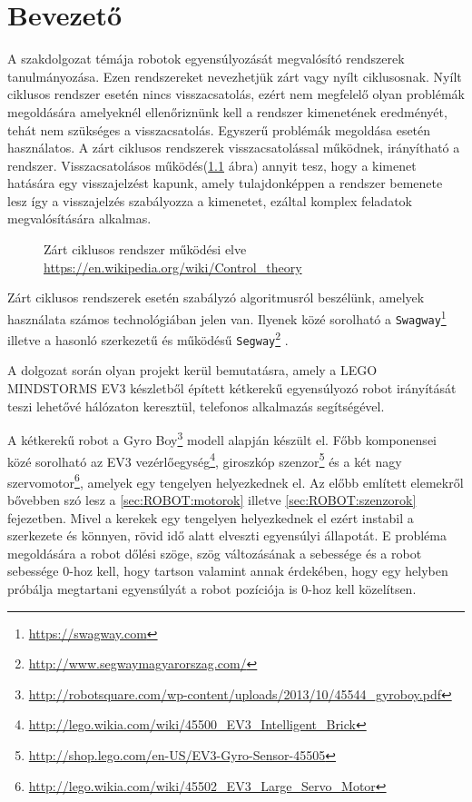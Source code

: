 \chapter{Bevezető}
A szakdolgozat témája robotok egyensúlyozását megvalósító rendszerek tanulmányozása. Ezen rendszereket nevezhetjük zárt vagy nyílt ciklusosnak. Nyílt ciklusos rendszer esetén nincs visszacsatolás, ezért nem megfelelő olyan problémák megoldására amelyeknél ellenőriznünk kell a rendszer kimenetének eredményét, tehát nem szükséges a visszacsatolás. Egyszerű problémák megoldása esetén használatos. A zárt ciklusos rendszerek visszacsatolással működnek, irányítható a rendszer. Visszacsatolásos működés(\ref{fig:closeLoop} ábra) annyit tesz, hogy a kimenet hatására egy visszajelzést kapunk, amely tulajdonképpen a rendszer bemenete lesz így a visszajelzés szabályozza a kimenetet, ezáltal komplex feladatok megvalósítására alkalmas.

\begin{figure}[!htb]
	\centering
	\caption[Zárt ciklusos rendszer működési elve.]
	{Zárt ciklusos rendszer működési elve \href{https://en.wikipedia.org/wiki/Control\_theory}{https://en.wikipedia.org/wiki/Control\_theory}}
	\label{fig:closeLoop}
\end{figure}

Zárt ciklusos rendszerek esetén szabályzó algoritmusról beszélünk, amelyek használata számos technológiában jelen van. Ilyenek közé sorolható a \texttt{Swagway}\footnote{\href{https://swagway.com}{https://swagway.com}} illetve a hasonló szerkezetű és működésű \texttt{Segway}\footnote{\href{http://www.segwaymagyarorszag.com/}{http://www.segwaymagyarorszag.com/}} .

A dolgozat során olyan projekt kerül bemutatásra, amely a LEGO MINDSTORMS EV3\cite{mindstormsEv3} készletből épített kétkerekű egyensúlyozó robot irányítását teszi lehetővé hálózaton keresztül, telefonos alkalmazás segítségével. 

A kétkerekű robot a Gyro Boy\footnote{\href{http://robotsquare.com/wp-content/uploads/2013/10/45544\_gyroboy.pdf}{http://robotsquare.com/wp-content/uploads/2013/10/45544\_gyroboy.pdf}} modell alapján készült el. Főbb komponensei közé sorolható az EV3 vezérlőegység\footnote{\href{http://lego.wikia.com/wiki/45500\_EV3\_Intelligent\_Brick}{http://lego.wikia.com/wiki/45500\_EV3\_Intelligent\_Brick}}, giroszkóp szenzor\footnote{\href{http://shop.lego.com/en-US/EV3-Gyro-Sensor-45505}{http://shop.lego.com/en-US/EV3-Gyro-Sensor-45505}} és a két nagy szervomotor\footnote{\href{http://lego.wikia.com/wiki/45502\_EV3\_Large\_Servo\_Motor}{http://lego.wikia.com/wiki/45502\_EV3\_Large\_Servo\_Motor}}, amelyek egy tengelyen helyezkednek el. Az előbb említett elemekről bővebben szó lesz a \ref{sec:ROBOT:motorok} illetve \ref{sec:ROBOT:szenzorok} fejezetben. Mivel a kerekek egy tengelyen helyezkednek el ezért instabil a szerkezete és könnyen, rövid idő alatt elveszti egyensúlyi állapotát. E probléma megoldására a robot dőlési szöge, szög változásának a sebessége és a robot sebessége 0-hoz kell, hogy tartson valamint annak érdekében, hogy egy helyben próbálja megtartani egyensúlyát a robot pozíciója is 0-hoz kell közelítsen. 

